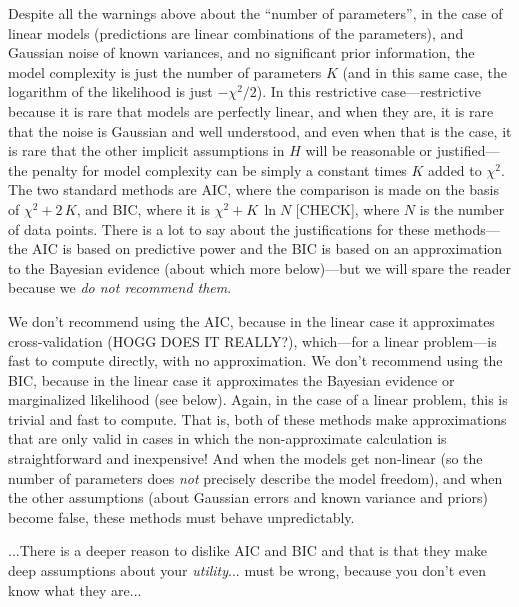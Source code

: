 \documentclass[12pt,twoside]{article}
\begin{document}
Despite all the warnings above about the ``number of parameters'', in
the case of linear models (predictions are linear combinations of the
parameters), and Gaussian noise of known variances, and no significant
prior information, the model complexity is just the number of
parameters $K$ (and in this same case, the logarithm of the likelihood
is just $-\chi^2/2$).  In this restrictive case---restrictive because
it is rare that models are perfectly linear, and when they are, it is
rare that the noise is Gaussian and well understood, and even when
that is the case, it is rare that the other implicit assumptions in
$H$ will be reasonable or justified---the penalty for model complexity
can be simply a constant times $K$ added to $\chi^2$.  The two
standard methods are AIC, where the comparison is made on the basis of $\chi^2 +
2\,K$, and BIC, where it is $\chi^2 + K\,\ln N$ [CHECK], where $N$ is
the number of data points.  There is a lot to say about the
justifications for these methods---the AIC is based on predictive
power and the BIC is based on an approximation to the Bayesian
evidence (about which more below)---but we will spare the reader
because we \emph{do not recommend them}.

We don't recommend using the AIC, because in the linear case it
approximates cross-validation (HOGG DOES IT REALLY?), which---for a
linear problem---is fast to compute directly, with no approximation.
We don't recommend using the BIC, because in the linear case it
approximates the Bayesian evidence or marginalized likelihood (see
below).  Again, in the case of a linear problem, this is trivial and
fast to compute.  That is, both of these methods make approximations
that are only valid in cases in which the non-approximate calculation
is straightforward and inexpensive!  And when the models get
non-linear (so the number of parameters does \emph{not} precisely
describe the model freedom), and when the other assumptions (about
Gaussian errors and known variance and priors) become false, these
methods must behave unpredictably.

...There is a deeper reason to dislike AIC and BIC and that is that
they make deep assumptions about your \emph{utility}... must be wrong,
because you don't even know what they are...
\end{document}
